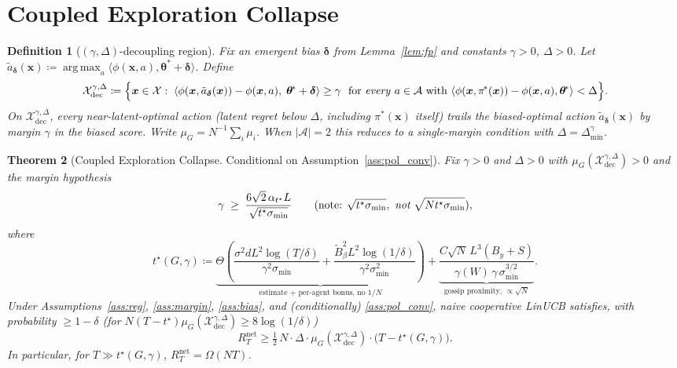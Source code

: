 \documentclass[11pt]{article}
\newtheorem{theorem}{Theorem}[section]
\newtheorem{definition}[theorem]{Definition}
\DeclareMathOperator*{\argmax}{arg\,max}
\begin{document}
\section{Coupled Exploration Collapse}\label{sec:cec}

\begin{definition}[$(\gamma,\Delta)$-decoupling region]\label{def:dec}
Fix an emergent bias $\bm{\delta}$ from Lemma~\ref{lem:fp} and
constants $\gamma>0$, $\Delta>0$.
Let $\tilde{a}_{\bm{\delta}}(\bm{x})\coloneqq
\argmax_a\langle\phi(\bm{x},a),\bm{\theta}^{\!*}+\bm{\delta}\rangle$.
Define
\[
\mathcal{X}_{\mathrm{dec}}^{\gamma,\Delta}\coloneqq\Bigl\{\bm{x}\in\mathcal{X}:\;
\langle\phi(\bm{x},\tilde{a}_{\bm{\delta}}(\bm{x}))
-\phi(\bm{x},a),\;\bm{\theta}^{\!*}+\bm{\delta}\rangle\geq\gamma
\ \text{ for \emph{every} } a\in\mathcal{A}\text{ with }
\langle\phi(\bm{x},\pi^{\!*}(\bm{x}))-\phi(\bm{x},a),
\bm{\theta}^{\!*}\rangle<\Delta
\Bigr\}.
\]
On $\mathcal{X}_{\mathrm{dec}}^{\gamma,\Delta}$, every
\emph{near-latent-optimal} action (latent regret below $\Delta$,
including $\pi^{\!*}(\bm{x})$ itself) trails the biased-optimal action
$\tilde a_{\bm\delta}(\bm{x})$ by margin $\gamma$ in the biased score.
Write $\mu_G=N^{-1}\sum_i\mu_i$.
When $|\mathcal{A}|=2$ this reduces to a single-margin condition with
$\Delta=\Delta_{\min}^\gamma$.
\end{definition}

\begin{theorem}[Coupled Exploration Collapse. Conditional on
Assumption~\ref{ass:pol_conv}]\label{thm:cec}
Fix $\gamma>0$ and $\Delta>0$ with
$\mu_G(\mathcal{X}_{\mathrm{dec}}^{\gamma,\Delta})>0$
and the \emph{margin hypothesis}
\begin{equation}
\gamma\;\geq\;\frac{6\sqrt{2}\,\alpha_{t^\star}L}{\sqrt{t^\star\sigma_{\min}}}
\qquad(\text{note: }\sqrt{t^\star\sigma_{\min}},\ \emph{not}\ \sqrt{Nt^\star\sigma_{\min}}),
\label{eq:margin_hyp}
\end{equation}
where
\begin{equation}
t^\star(G,\gamma)\coloneqq
\underbrace{\Theta\!\left(
\frac{\sigma^2 dL^2\log(T/\delta)}{\gamma^2\sigma_{\min}}
+\frac{\widetilde B_\beta^2 L^2\log(1/\delta)}{\gamma^2\sigma_{\min}^2}\right)}_{\text{estimate + per-agent bonus, no }1/N}
+\underbrace{\frac{C\sqrt{N}\,L^3(B_y+S)}{\gamma(W)\,\gamma\,\sigma_{\min}^{3/2}}}_{\text{gossip proximity, }\propto\sqrt N}.
\label{eq:tstar_full}
\end{equation}
Under Assumptions~\ref{ass:reg}, \ref{ass:margin}, \ref{ass:bias},
and (conditionally) \ref{ass:pol_conv}, naive cooperative LinUCB
satisfies, with probability $\geq 1-\delta$ (for
$N(T-t^\star)\mu_G(\mathcal{X}_{\mathrm{dec}}^{\gamma,\Delta})\geq 8\log(1/\delta)$) \begin{equation}
R_T^{\mathrm{net}}\geq
\tfrac12\,N\cdot\Delta\cdot\mu_G(\mathcal{X}_{\mathrm{dec}}^{\gamma,\Delta})
\cdot\bigl(T-t^\star(G,\gamma)\bigr).
\label{eq:cec_bound}
\end{equation}
In particular, for $T\gg t^\star(G,\gamma)$,
$R_T^{\mathrm{net}}=\Omega(NT)$.
\end{theorem}
\end{document}
